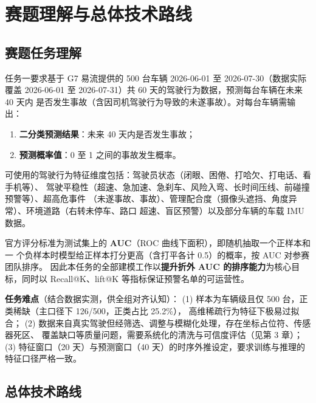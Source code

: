 \section{赛题理解与总体技术路线}

\subsection{赛题任务理解}

任务一要求基于 G7 易流提供的 500 台车辆 2026-06-01 至 2026-07-30（数据实际覆盖
2026-06-01 至 2026-07-31）共 60 天的驾驶行为数据，预测每台车辆在未来 40 天内
是否发生事故（含因司机驾驶行为导致的未遂事故）。对每台车辆需输出：
\begin{enumerate}[label=(\arabic*)]
  \item \textbf{二分类预测结果}：未来 40 天内是否发生事故；
  \item \textbf{预测概率值}：0 至 1 之间的事故发生概率。
\end{enumerate}

可使用的驾驶行为特征维度包括：驾驶员状态（闭眼、困倦、打哈欠、打电话、看手机等）、
驾驶平稳性（超速、急加速、急刹车、风险入弯、长时间压线、前碰撞预警等）、超高危事件
（未遂事故、事故）、管理配合度（摄像头遮挡、角度异常）、环境道路（右转未停车、路口
超速、盲区预警）以及部分车辆的车载 IMU 数据。

官方评分标准为测试集上的 \textbf{AUC}（ROC 曲线下面积），即随机抽取一个正样本和一
个负样本时模型给正样本打分更高（含打平各计 0.5）的概率，按 AUC 对参赛团队排序。
因此本任务的全部建模工作以\textbf{提升折外 AUC 的排序能力}为核心目标，同时以
Recall@K、lift@K 等指标保证预警名单的可运营性。

\begin{hlbox}
\textbf{任务难点}（结合数据实测，供全组对齐认知）：
(1) 样本为车辆级且仅 500 台，正类稀缺（主口径下 126/500，正类占比 25.2\%），
高维稀疏行为特征下极易过拟合；
(2) 数据来自真实驾驶但经筛选、调整与模糊化处理，存在坐标占位符、传感器死区、
覆盖缺口等质量问题，需要系统化的清洗与可信度评估（见第 3 章）；
(3) 特征窗口（20 天）与预测窗口（40 天）的时序外推设定，要求训练与推理的
特征口径严格一致。
\end{hlbox}

\subsection{总体技术路线}

